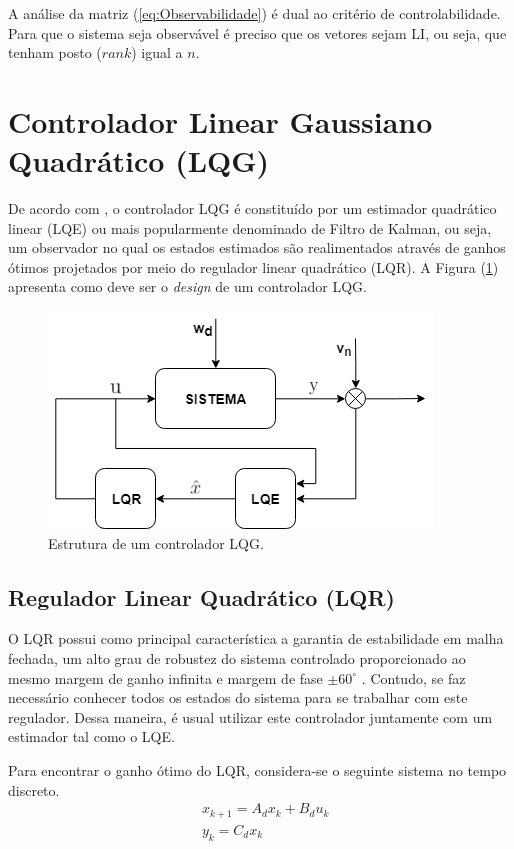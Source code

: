 A análise da matriz (\ref{eq:Observabilidade}) é dual ao critério de controlabilidade. Para que o sistema seja observável é preciso que os vetores sejam LI, ou seja, que tenham posto ($\textit{rank}$) igual a $n$.

\section{Controlador Linear Gaussiano Quadrático (LQG)}\label{sec:MetodologiaControladorLQG}

De acordo com \cite{Steven:17}, o controlador LQG é constituído por um estimador quadrático linear (LQE) ou mais popularmente denominado de Filtro de Kalman, ou seja, um observador no qual os estados estimados são realimentados através de ganhos ótimos projetados por meio do regulador linear quadrático (LQR). A Figura (\ref{fig:controladorLQG}) apresenta como deve ser o \textit{design} de um controlador LQG.
\begin{figure}[H]
    \centering
    \includegraphics[scale=0.75]{Fundamentos/LQG}
    \caption{Estrutura de um controlador LQG.}
    \label{fig:controladorLQG}
\end{figure}

\subsection{Regulador Linear Quadrático  (LQR)}\label{subsec:MetodologiaControladorLQR}

O LQR possui como principal característica a garantia de estabilidade em malha fechada, um alto grau de robustez do sistema controlado proporcionado ao mesmo margem de ganho infinita e margem de fase $\pm 60^\circ$ \citep{Fernandes:14}. Contudo, se faz necessário conhecer todos os estados do sistema para se trabalhar com este regulador. Dessa maneira, é usual utilizar este controlador juntamente com um estimador tal como o LQE.

Para encontrar o ganho ótimo do LQR, considera-se o seguinte sistema no tempo discreto.
\begin{equation}
    \begin{array}{cc}
         &  x_{k+1} = A_dx_k + B_du_k \\[6pt]
         &  y_k = C_dx_k
    \end{array}{}
\end{equation}{}

